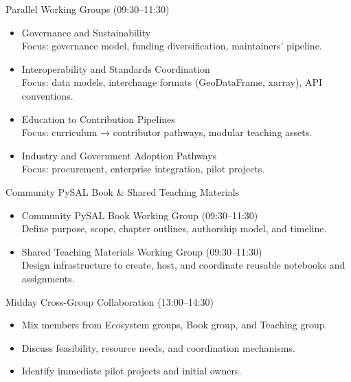 \documentclass[11pt, aspectratio=169]{beamer}
\begin{document}
\begin{frame}{Parallel Working Groups (09:30--11:30)}
  \begin{itemize}
    \item Governance and Sustainability\\
      \quad Focus: governance model, funding diversification, maintainers' pipeline.
    \item Interoperability and Standards Coordination\\
      \quad Focus: data models, interchange formats (GeoDataFrame, xarray), API conventions.
    \item Education to Contribution Pipelines\\
      \quad Focus: curriculum → contributor pathways, modular teaching assets.
    \item Industry and Government Adoption Pathways\\
      \quad Focus: procurement, enterprise integration, pilot projects.
  \end{itemize}

\end{frame}

\begin{frame}{Community PySAL Book \& Shared Teaching Materials}
  \begin{itemize}
    \item Community PySAL Book Working Group (09:30--11:30)\\
      \quad Define purpose, scope, chapter outlines, authorship model, and timeline.
    \item Shared Teaching Materials Working Group (09:30--11:30)\\
      \quad Design infrastructure to create, host, and coordinate reusable notebooks and assignments.
  \end{itemize}

\end{frame}

\begin{frame}{Midday Cross-Group Collaboration (13:00--14:30)}
  \begin{itemize}
    \item Mix members from Ecosystem groups, Book group, and Teaching group.
    \item Discuss feasibility, resource needs, and coordination mechanisms.
    \item Identify immediate pilot projects and initial owners.
  \end{itemize}

\end{frame}
\end{document}
